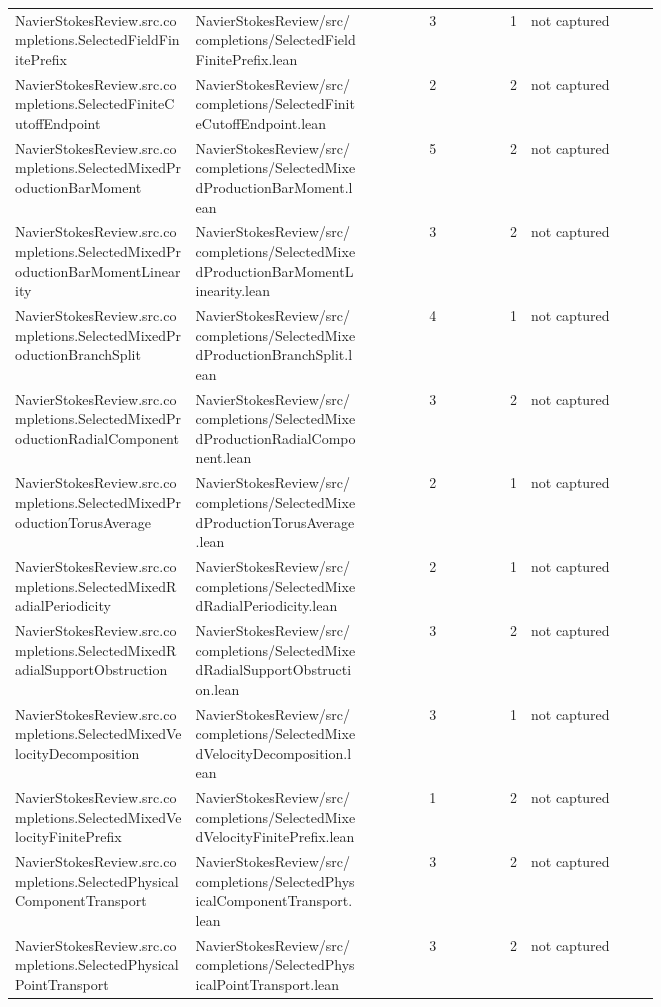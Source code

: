 \documentclass[10pt]{article}
\begin{document}
\begin{longtable}{p{0.28\linewidth}p{0.27\linewidth}r r p{0.20\linewidth}}
NavierStokesReview.src.completions.SelectedFieldFinitePrefix & NavierStokesReview/src/completions/SelectedFieldFinitePrefix.lean & 3 & 1 & not captured\\
NavierStokesReview.src.completions.SelectedFiniteCutoffEndpoint & NavierStokesReview/src/completions/SelectedFiniteCutoffEndpoint.lean & 2 & 2 & not captured\\
NavierStokesReview.src.completions.SelectedMixedProductionBarMoment & NavierStokesReview/src/completions/SelectedMixedProductionBarMoment.lean & 5 & 2 & not captured\\
NavierStokesReview.src.completions.SelectedMixedProductionBarMomentLinearity & NavierStokesReview/src/completions/SelectedMixedProductionBarMomentLinearity.lean & 3 & 2 & not captured\\
NavierStokesReview.src.completions.SelectedMixedProductionBranchSplit & NavierStokesReview/src/completions/SelectedMixedProductionBranchSplit.lean & 4 & 1 & not captured\\
NavierStokesReview.src.completions.SelectedMixedProductionRadialComponent & NavierStokesReview/src/completions/SelectedMixedProductionRadialComponent.lean & 3 & 2 & not captured\\
NavierStokesReview.src.completions.SelectedMixedProductionTorusAverage & NavierStokesReview/src/completions/SelectedMixedProductionTorusAverage.lean & 2 & 1 & not captured\\
NavierStokesReview.src.completions.SelectedMixedRadialPeriodicity & NavierStokesReview/src/completions/SelectedMixedRadialPeriodicity.lean & 2 & 1 & not captured\\
NavierStokesReview.src.completions.SelectedMixedRadialSupportObstruction & NavierStokesReview/src/completions/SelectedMixedRadialSupportObstruction.lean & 3 & 2 & not captured\\
NavierStokesReview.src.completions.SelectedMixedVelocityDecomposition & NavierStokesReview/src/completions/SelectedMixedVelocityDecomposition.lean & 3 & 1 & not captured\\
NavierStokesReview.src.completions.SelectedMixedVelocityFinitePrefix & NavierStokesReview/src/completions/SelectedMixedVelocityFinitePrefix.lean & 1 & 2 & not captured\\
NavierStokesReview.src.completions.SelectedPhysicalComponentTransport & NavierStokesReview/src/completions/SelectedPhysicalComponentTransport.lean & 3 & 2 & not captured\\
NavierStokesReview.src.completions.SelectedPhysicalPointTransport & NavierStokesReview/src/completions/SelectedPhysicalPointTransport.lean & 3 & 2 & not captured\\

\end{longtable}
\end{document}
